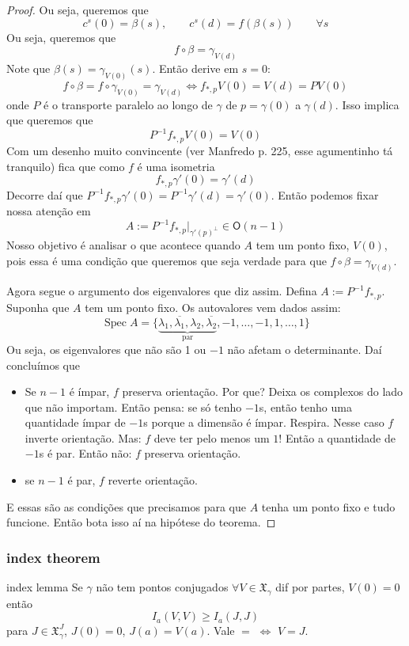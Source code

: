 \begin{proof}
Ou seja, queremos que
\[c^s(0)=\beta(s),\qquad c^s(d)=f(\beta(s))\qquad \forall s\]
Ou seja, queremos que
\[f \circ \beta=\gamma_{V(d)}\]
Note que \(\beta(s)=\gamma_{V(0)}(s)\). Então derive em \(s=0\): 
\[f \circ \beta=f\circ\gamma_{V(0)}=\gamma_{V(d)}\iff f_{*,p}V(0)=V(d)=PV(0)\]
onde \(P\) é o transporte paralelo ao longo de \(\gamma\) de \(p=\gamma(0)\) a \(\gamma(d)\).
Isso implica que queremos que
\[P^{-1}f_{*,p}V(0)=V(0)\]
Com um desenho muito convincente (ver Manfredo p. 225, esse agumentinho tá tranquilo) fica que como \(f\) é uma isometria
\[f_{*,p}\gamma'(0)=\gamma'(d)\]
Decorre daí que \(P^{-1}f_{*,p}\gamma'(0)=P^{-1}\gamma'(d)=\gamma'(0)\). Então podemos fixar nossa atenção em
\[A:=P^{-1}f_{*,p}|_{\gamma'(p)^\perp}\in \mathsf{O}(n-1)\]
Nosso objetivo é analisar o que acontece quando \(A\) tem um ponto fixo, \(V(0)\), pois essa é uma condição que queremos que seja verdade para que \(f\circ \beta = \gamma_{V(d)}\).

Agora segue o argumento dos eigenvalores que diz assim. Defina \(A:=P^{-1}f_{*,p}\). Suponha que \(A\) tem um ponto fixo. Os autovalores vem dados assim:
\[\operatorname{Spec}A=\{\underbrace{\lambda_1,\overline{\lambda_1},\lambda_2,\overline{\lambda_2}}_{\text{par} },-1,\ldots,-1,1,\ldots,1\}\]
Ou seja, os eigenvalores que não são 1 ou \(-1\) não afetam o determinante. Daí concluímos que
\begin{itemize}
\item Se \(n-1\) é ímpar, \(f\) preserva orientação. Por que? Deixa os complexos do lado que não importam. Então pensa: se só tenho \(-1\)s, então tenho uma quantidade ímpar de \(-1\)s porque a dimensão é ímpar. Respira. Nesse caso \(f\) inverte orientação. Mas: \(f\) deve ter pelo menos um \(1\)! Então a quantidade de \(-1\)s  é par. Então não: \(f\) preserva orientação.
\item se \(n-1\) é par, \(f\) reverte orientação.
\end{itemize}
E essas são as condições que precisamos para que \(A\) tenha um ponto fixo e tudo funcione. Então bota isso aí na hipótese do teorema.
\end{proof}

\subsubsection{index theorem}

\begin{thing6}{index lemma}\leavevmode
Se \(\gamma\) não tem pontos conjugados \(\forall V \in \mathfrak{X}_\gamma\) dif por partes, \(V(0)=0\) então
	\[\boxed{I_a(V,V) \geq I_a(J,J)}\]
para \(J \in \mathfrak{X}^J_\gamma\), \(J(0)=0\), \(J(a)=V(a)\). Vale \(=\) \(\iff\) \(V=J\).
\end{thing6}

